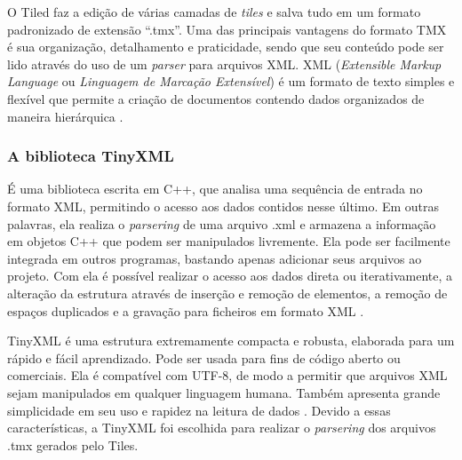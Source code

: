 %
%
%
\par
O Tiled faz a edição de várias camadas de \textit{tiles} e salva tudo em um formato padronizado de extensão ``.tmx''. Uma das principais vantagens do formato TMX é sua organização, detalhamento e praticidade, sendo que seu conteúdo pode ser lido através do uso de um \textit{parser} para arquivos XML. XML (\textit{Extensible Markup Language} ou \textit{Linguagem de Marcação Extensível}) é um formato de texto simples e flexível que permite a criação de documentos contendo dados organizados de maneira hierárquica \cite{XMLDOC}.  
%
%
\subsubsection{A biblioteca TinyXML}
\label{tinyXML}
%
É uma biblioteca escrita em C++, que analisa uma sequência de entrada no formato XML, permitindo o acesso aos dados contidos nesse último. Em outras palavras, ela realiza o \textit{parsering} de uma arquivo .xml e armazena a informação em objetos C++ que podem ser manipulados livremente. Ela pode ser facilmente integrada em outros programas, bastando apenas adicionar seus arquivos ao projeto. Com ela é possível realizar o acesso aos dados direta ou iterativamente, a alteração da estrutura através de inserção e remoção de elementos, a remoção de espaços duplicados e a gravação para ficheiros em formato XML \cite{TinyXMLTutorial}.
\par
TinyXML é uma estrutura extremamente compacta e robusta, elaborada para um rápido e fácil aprendizado. Pode ser usada para fins de código aberto ou comerciais. Ela é compatível com UTF-8, de modo a permitir que arquivos XML sejam manipulados em qualquer linguagem humana. Também apresenta grande simplicidade em seu uso e rapidez na leitura de dados \cite{TinyXMLTutorial}. Devido a essas características, a TinyXML foi escolhida para realizar o \textit{parsering} dos arquivos .tmx gerados pelo Tiles.
%
%
